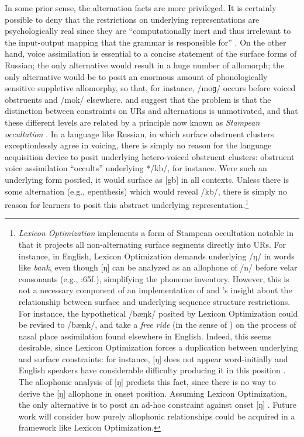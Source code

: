 In some prior sense, the alternation facts are more privileged.
It is certainly possible to deny that the restrictions on underlying representations are psychologically real since they are ``computationally inert and thus irrelevant to the input-output mapping that the grammar is responsible for'' \citep[18]{PE}.
On the other hand, voice assimilation is essential to a concise statement of the surface forms of Russian; the only alternative would result in a huge number of allomorph; the only alternative would be to posit an enormous amount of phonologically sensitive suppletive allomorphy, so that, for instance, /moɡ/ occurs before voiced obstruents and /mok/ elsewhere.
 and  suggest that the problem is that the distinction between constraints on URs and alternations is unmotivated, and that these different levels are related by a principle now known as \emph{Stampean occultation} \cite[54]{OT}.
In a language like Russian, in which surface obstruent clusters exceptionlessly agree in voicing, there is simply no reason for the language acquisition device to posit underlying hetero-voiced obstruent clusters: obstruent voice assimilation ``occults'' underlying */kb/, for instance.
Were such an underlying form posited, it would surface as [gb] in all contexts.
Unless there is some alternation (e.g., epenthesis) which would reveal /kb/, there is simply no reason for learners to posit this abstract underlying representation.\footnote{
    \emph{Lexicon Optimization} \cite[209]{OT} implements a form of Stampean occultation notable in that it projects all non-alternating surface segments directly into URs.
    For instance, in English, Lexicon Optimization demands underlying /ŋ/ in words like \emph{bank}, even though [ŋ] can be analyzed as an allophone of /n/ before velar consonants (e.g., :65f.), simplifying the phoneme inventory.
    However, this is not a necessary component of an implementation of \citeauthor{Dell1973} and \citeauthor{Stampe1973}'s insight about the relationship between surface and underlying sequence structure restrictions.
    For instance, the hypothetical /bæŋk/ posited by Lexicon Optimization could be revised to /bænk/, and take a \emph{free ride} (in the sense of \citealt{Zwicky1970}) on the process of nasal place assimilation found elsewhere in English.
    Indeed, this seems desirable, since Lexicon Optimization forces a duplication between underlying and surface constraints: for instance, [ŋ] does not appear word-initially and English speakers have considerable difficulty producing it in this position \cite{Rusaw2009}.
    The allophonic analysis of [ŋ] predicts this fact, since there is no way to derive the [ŋ] allophone in onset position.
    Assuming Lexicon Optimization, the only alternative is to posit an ad-hoc constraint against onset [ŋ] \citep[39]{Jusczyk2002}.
    Future work will consider how purely allophonic relationships could be acquired in a framework like Lexicon Optimization.}
